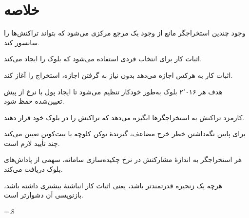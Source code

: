 \documentclass[oneside,a4paper,12pt]{book}
\renewcommand{\bibname}{\rl{{مراجع}\hfill}}
\newcommand{\پاورقی}[2]{%
  \footnote{%
    \scriptsize
    \setlength{\parindent}{0pt}%
    \setlength{\parskip}{0pt}%
    \lr{#1} -- معادل فارسی: #2%
  }}
\newcommand{\قاب}[3][]{%
  \begin{center}
  \fbox{\begin{minipage}{0.78\textwidth}
  \begin{flushright}
  \textbf{#2}\par\smallskip
  #3
  \end{flushright}
  \end{minipage}}
  \end{center}}
\begin{document}
\section{خلاصه}
وجود چندین استخراجگر مانع از وجود یک مرجع مرکزی می‌شود که بتواند تراکنش‌ها را سانسور کند.

اثبات کار برای انتخاب فردی استفاده می‌شود که بلوک را ایجاد می‌کند.

اثبات کار به هرکس اجازه می‌دهد بدون نیاز به گرفتن اجازه، استخراج را آغاز کند.

هدف هر ۲٬۰۱۶ بلوک به‌طور خودکار تنظیم می‌شود تا ایجاد پول با نرخ از پیش تعیین‌شده حفظ شود.

کارمزد تراکنش به استخراجگرها انگیزه می‌دهد که تراکنش را در بلوک خود قرار دهند.

برای پایین نگه‌داشتن خطر خرج مضاعف، گیرندهٔ توکن کلوچه یا بیت‌کوین تعیین می‌کند چند تأیید لازم است.

هر استخراجگر به اندازهٔ مشارکتش در نرخ چکیده‌سازی سامانه، سهمی از پاداش‌های بلوک دریافت می‌کند.

هرچه یک زنجیره قدرتمندتر باشد، یعنی اثبات کار انباشتهٔ بیشتری داشته باشد، بازنویسی آن دشوارتر است.

\clearpage
{}
{}
\renewcommand{\refname}{مراجع}
\renewcommand\bibname{مراجع}
\baselineskip=.8\baselineskip

\nocite{rosenbaum2019grokking}

\end{document}
